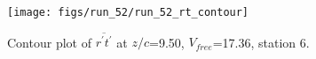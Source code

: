 \begin{figure}[H]
\centering
\texttt{[image: figs/run\_52/run\_52\_rt\_contour]}
\caption{Contour plot of $\overline{r^\prime t^\prime}$ at $z/c$=9.50, $V_{free}$=17.36, station 6.}
\label{fig:run_52_rt_contour}
\end{figure}


